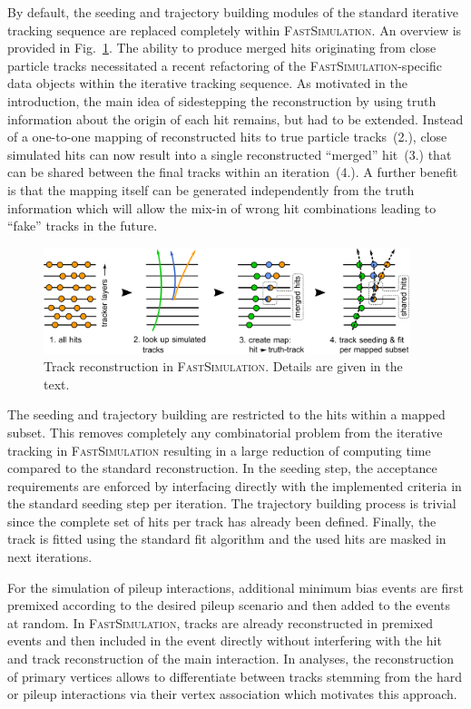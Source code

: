 \documentclass[a4paper]{jpconf}
\begin{document}
By default, the seeding and trajectory building modules of the standard iterative tracking sequence are replaced completely within \textsc{FastSimulation}. An overview is provided in Fig.~\ref{fig:tracking}. The ability to produce merged hits originating from close particle tracks necessitated a recent refactoring of the \textsc{FastSimulation}-specific data objects within the iterative tracking sequence. As motivated in the introduction, the main idea of sidestepping the reconstruction by using truth information about the origin of each hit remains, but had to be extended. Instead of a one-to-one mapping of reconstructed hits to true particle tracks~(2.), close simulated hits can now result into a single reconstructed ``merged'' hit~(3.) that can be shared between the final tracks within an iteration~(4.). A further benefit is that the mapping itself can be generated independently from the truth information which will allow the mix-in of wrong hit combinations leading to ``fake'' tracks in the future.

\begin{figure}[htbp]
\begin{center}
\includegraphics[width=0.95\textwidth]{figures/tracking.pdf}
\caption{\label{fig:tracking}Track reconstruction in \textsc{FastSimulation}. Details are given in the text.}
\end{center}
\end{figure}

The seeding and trajectory building are restricted to the hits within a mapped subset. This removes completely any combinatorial problem from the iterative tracking in \textsc{FastSimulation} resulting in a large reduction of computing time compared to the standard reconstruction. In the seeding step, the acceptance requirements are enforced by interfacing directly with the implemented criteria in the standard seeding step per iteration. The trajectory building process is trivial since the complete set of hits per track has already been defined. Finally, the track is fitted using the standard fit algorithm and the used hits are masked in next iterations.

For the simulation of pileup interactions, additional minimum bias events are first premixed according to the desired pileup scenario and then added to the events at random. In \textsc{FastSimulation}, tracks are already reconstructed in premixed events and then included in the event directly without interfering with the hit and track reconstruction of the main interaction. In analyses, the reconstruction of primary vertices allows to differentiate between tracks stemming from the hard or pileup interactions via their vertex association which motivates this approach.
\end{document}
